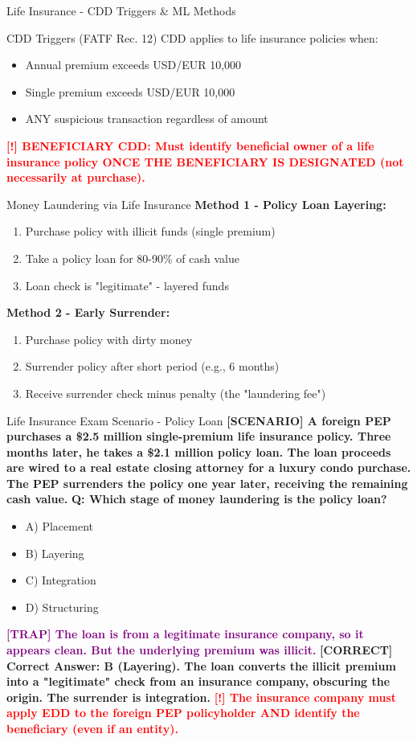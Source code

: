 \documentclass[11pt,a4paper]{beamer}
\newcommand{\redflag}[1]{\textcolor{red}{\textbf{[!] #1}}}
\newcommand{\trap}[1]{\textcolor{purple}{\textbf{[TRAP] #1}}}
\newcommand{\correct}[1]{\textcolor{green!50!black}{\textbf{[CORRECT] #1}}}
\newcommand{\scenario}[1]{\textcolor{blue!70!black}{\textbf{[SCENARIO] #1}}}
\begin{document}
\begin{frame}{Life Insurance - CDD Triggers \& ML Methods}
\begin{block}{CDD Triggers (FATF Rec. 12)}
CDD applies to life insurance policies when:
\begin{itemize}
\item Annual premium exceeds USD/EUR 10,000
\item Single premium exceeds USD/EUR 10,000
\item ANY suspicious transaction regardless of amount
\end{itemize}
\redflag{BENEFICIARY CDD: Must identify beneficial owner of a life insurance policy ONCE THE BENEFICIARY IS DESIGNATED (not necessarily at purchase).}
\end{block}
\begin{block}{Money Laundering via Life Insurance}
\textbf{Method 1 - Policy Loan Layering:}
\begin{enumerate}
\item Purchase policy with illicit funds (single premium)
\item Take a policy loan for 80-90\% of cash value
\item Loan check is "legitimate" - layered funds
\end{enumerate}
\textbf{Method 2 - Early Surrender:}
\begin{enumerate}
\item Purchase policy with dirty money
\item Surrender policy after short period (e.g., 6 months)
\item Receive surrender check minus penalty (the "laundering fee")
\end{enumerate}
\end{block}
\end{frame}

\begin{frame}{Life Insurance Exam Scenario - Policy Loan}
\scenario{A foreign PEP purchases a \$2.5 million single-premium life insurance policy. Three months later, he takes a \$2.1 million policy loan. The loan proceeds are wired to a real estate closing attorney for a luxury condo purchase. The PEP surrenders the policy one year later, receiving the remaining cash value.}
\vspace{0.2cm}
\textbf{Q: Which stage of money laundering is the policy loan?}
\begin{itemize}
\item A) Placement
\item B) Layering
\item C) Integration
\item D) Structuring
\end{itemize}
\trap{The loan is from a legitimate insurance company, so it appears clean. But the underlying premium was illicit.}
\correct{Correct Answer: B (Layering). The loan converts the illicit premium into a "legitimate" check from an insurance company, obscuring the origin. The surrender is integration.}
\redflag{The insurance company must apply EDD to the foreign PEP policyholder AND identify the beneficiary (even if an entity).}
\end{frame}
\end{document}
